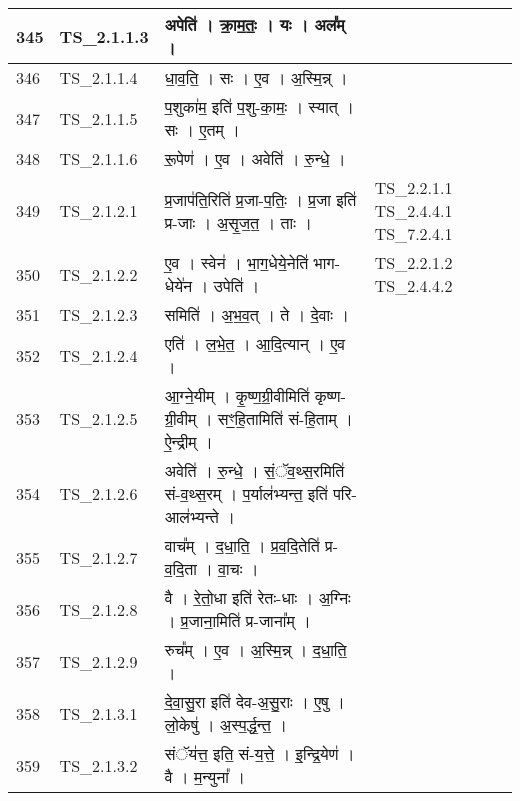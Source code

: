 \documentclass[17pt]{extarticle}
\begin{document}
\begin{longtable}{||p{0.4in}||p{0.9in}||p{4.0in}||p{0.9in}||}
        \hline
            345 & TS\_2.1.1.3 & अपेति॑   ।   क्रा॒म॒तः॒   ।   यः   ।   अल᳚म्   ।    &      \\
        \hline
            346 & TS\_2.1.1.4 & धा॒व॒ति॒   ।   सः   ।   ए॒व   ।   अ॒स्मि॒न्न्   ।    &      \\
        \hline
            347 & TS\_2.1.1.5 & प॒शुका॑म॒ इति॑ प॒शु{-}का॒मः॒   ।   स्यात्   ।   सः   ।   ए॒तम्   ।    &      \\
        \hline
            348 & TS\_2.1.1.6 & रू॒पेण॑   ।   ए॒व   ।   अवेति॑   ।   रु॒न्धे॒   ।    &      \\
        \hline
            349 & TS\_2.1.2.1 & प्र॒जाप॑ति॒रिति॑ प्र॒जा{-}प॒तिः॒   ।   प्र॒जा इति॑ प्र{-}जाः   ।   अ॒सृ॒ज॒त॒   ।   ताः   ।    &  TS\_2.2.1.1 TS\_2.4.4.1 TS\_7.2.4.1       \\
        \hline
            350 & TS\_2.1.2.2 & ए॒व   ।   स्वेन॑   ।   भा॒ग॒धेये॒नेति॑ भाग{-}धेये॑न   ।   उपेति॑   ।    &  TS\_2.2.1.2 TS\_2.4.4.2       \\
        \hline
            351 & TS\_2.1.2.3 & समिति॑   ।   अ॒भ॒व॒त्   ।   ते   ।   दे॒वाः   ।    &      \\
        \hline
            352 & TS\_2.1.2.4 & एति॑   ।   ल॒भे॒त॒   ।   आ॒दि॒त्यान्   ।   ए॒व   ।    &      \\
        \hline
            353 & TS\_2.1.2.5 & आ॒ग्ने॒यीम्   ।   कृ॒ष्ण॒ग्री॒वीमिति॑ कृष्ण{-}ग्री॒वीम्   ।   सꣳ॒॒हि॒तामिति॑ सं{-}हि॒ताम्   ।   ऐ॒न्द्रीम्   ।    &      \\
        \hline
            354 & TS\_2.1.2.6 & अवेति॑   ।   रु॒न्धे॒   ।   सं॒ॅव॒थ्स॒रमिति॑ सं{-}व॒थ्स॒रम्   ।   प॒र्याल॑भ्यन्त॒ इति॑ परि{-}आल॑भ्यन्ते   ।    &      \\
        \hline
            355 & TS\_2.1.2.7 & वाच᳚म्   ।   द॒धा॒ति॒   ।   प्र॒व॒दि॒तेति॑ प्र{-}व॒दि॒ता   ।   वा॒चः   ।    &      \\
        \hline
            356 & TS\_2.1.2.8 & वै   ।   रे॒तो॒धा इति॑ रेतः{-}धाः   ।   अ॒ग्निः   ।   प्र॒जाना॒मिति॑ प्र{-}जाना᳚म्   ।    &      \\
        \hline
            357 & TS\_2.1.2.9 & रुच᳚म्   ।   ए॒व   ।   अ॒स्मि॒न्न्   ।   द॒धा॒ति॒   ।    &      \\
        \hline
            358 & TS\_2.1.3.1 & दे॒वा॒सु॒रा इति॑ देव{-}अ॒सु॒राः   ।   ए॒षु   ।   लो॒केषु॑   ।   अ॒स्प॒र्द्ध॒न्त॒   ।    &      \\
        \hline
            359 & TS\_2.1.3.2 & संॅय॑त्त॒ इति॒ सं{-}य॒त्ते॒   ।   इ॒न्द्रि॒येण॑   ।   वै   ।   म॒न्युना᳚   ।    &      \\

\end{longtable}
\end{document}
